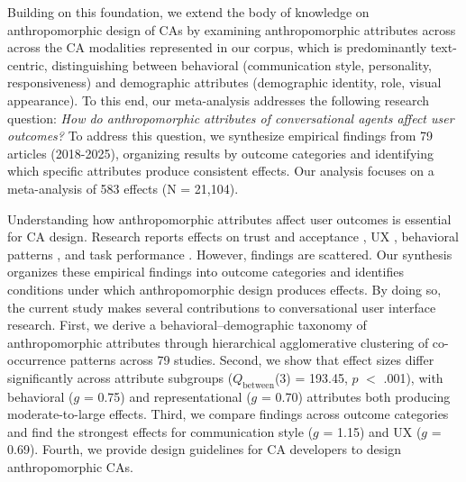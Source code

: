 \documentclass[lettersize,journal]{IEEEtran}
\begin{document}
Building on this foundation, we extend the body of knowledge on anthropomorphic design of CAs by examining anthropomorphic attributes across across the CA modalities represented in our corpus, which is predominantly text-centric, distinguishing between behavioral (communication style, personality, responsiveness) and demographic attributes (demographic identity, role, visual appearance). %
To this end, our meta-analysis addresses the following research question: 
\textit{How do anthropomorphic attributes of conversational agents affect user outcomes?} 
To address this question, we synthesize empirical findings from 79 articles (2018-2025), organizing results by outcome categories and identifying which specific attributes produce consistent effects. Our analysis focuses on a meta-analysis of 583 effects (N = 21,104). %

Understanding how anthropomorphic attributes affect user outcomes is essential for CA design. Research reports effects on trust and acceptance \cite{kraus_role_2021,chandra_be_2022}, UX \cite{lieb_student_2024,liu_older_2023}, behavioral patterns \cite{mehra_chatbot_2021,chen_you_2021}, and task performance \cite{zheldibayeva_genai_2025,baihaqi_rapport-driven_2024}. However, findings are scattered. Our synthesis organizes these empirical findings into outcome categories and identifies conditions under which anthropomorphic design produces effects.
By doing so, the current study makes several contributions to conversational user interface research. First, we derive a behavioral–demographic taxonomy of anthropomorphic attributes through hierarchical agglomerative clustering of co-occurrence patterns across 79 studies. Second, we show that effect sizes differ significantly across attribute subgroups ($Q_{\text{between}}$(3) = 193.45, $p$ $<$ .001), with behavioral ($g$ = 0.75) and representational ($g$ = 0.70) attributes both producing moderate-to-large effects. Third, we compare findings across outcome categories and find the strongest effects for communication style ($g$ = 1.15) and UX ($g$ = 0.69). Fourth, we provide design guidelines for CA developers to design anthropomorphic CAs.
\end{document}
